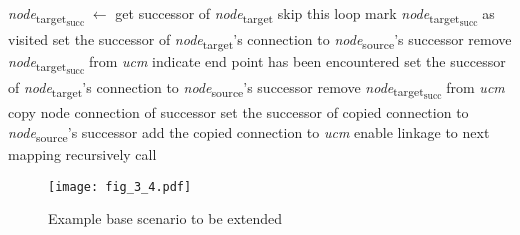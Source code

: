 \begin{algorithm}                     
	\begin{algorithmic}[1]
		
				\State \emph{node}\textsubscript{target\textsubscript{succ}} $\gets$ get successor of \emph{node}\textsubscript{target}
				 \label{alg:1.10}
					\State skip this loop
					\State mark \emph{node}\textsubscript{target\textsubscript{succ}} as visited
				\EndIf \label{alg:1.11}
				 \label{alg:1.12}
						\State set the successor of \emph{node}\textsubscript{target}'s connection to \emph{node}\textsubscript{source}'s successor
						\State remove \emph{node}\textsubscript{target\textsubscript{succ}} from \emph{ucm}
						\State indicate end point has been encountered
					\EndIf \label{alg:1.13}
				 \label{alg:1.14}
					\State set the successor of \emph{node}\textsubscript{target}'s connection to \emph{node}\textsubscript{source}'s successor
						\State remove \emph{node}\textsubscript{target\textsubscript{succ}} from \emph{ucm}
					\EndIf \label{alg:1.15}
				 \label{alg:1.16}
					\State copy node connection of successor
					\State set the successor of copied connection to \emph{node}\textsubscript{source}'s successor
					\State add the copied connection to \emph{ucm}
					\State enable linkage to next mapping \label{alg:1.17}
				\Else
					\State recursively call  \label{alg:1.18}
				\EndIf
			\EndFor
		\EndFunction
	\end{algorithmic}
\end{algorithm}

\begin{figure}
	\centering
	\texttt{[image: fig\_3\_4.pdf]}
	\caption{Example base scenario to be extended}
	\label{fig:3.4}
\end{figure}

